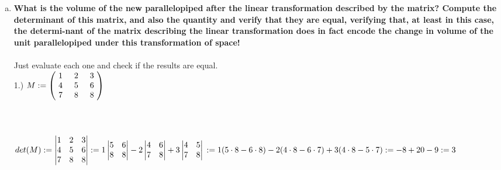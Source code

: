 \documentclass{article}
\begin{document}
\begin{enumerate}[c.]
	\item\textbf{What is the volume of the new parallelopiped after
	      the linear transformation described by the matrix? Compute the determinant
	      of this matrix, and also the quantity and verify that they are equal, verifying that, at least in this case, the determi-nant of the matrix describing the linear transformation does in fact encode the change in volume of the unit parallelopiped under this transformation of space!}\\
	\\
	Just evaluate each one and check if the results are equal.\\
	1.)
	$M:=\left(\!
	\begin{array}{c}
		1 \hspace{.5cm} 2 \hspace{.5cm} 3 \\
		4 \hspace{.5cm} 5 \hspace{.5cm} 6 \\
		7 \hspace{.5cm} 8 \hspace{.5cm} 8 \\
	\end{array}
	\!\right)$\\
	\\  
	\\
	\\
	$det(M ) := \begin{vmatrix}
	1&2&3\\
	4&5&6\\
	7&8&8\\
	\end{vmatrix}:=1\begin{vmatrix}
	5&6\\
	8&8\\
	\end{vmatrix}-2\begin{vmatrix}
	4&6\\
	7&8\\
	\end{vmatrix}+3\begin{vmatrix}
	4&5\\
	7&8\\
	\end{vmatrix}\\:=1(5\cdot8-6\cdot8)-2(4\cdot8-6\cdot7)+3(4\cdot8-5\cdot7)\\:=-8+20-9:=3$\\

\end{enumerate}
\end{document}

